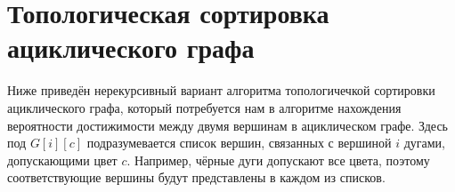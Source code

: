 \section*{Топологическая сортировка ациклического графа}
\par Ниже приведён нерекурсивный вариант алгоритма топологичечкой сортировки ациклического графа, который потребуется нам в алгоритме нахождения вероятности достижимости между двумя вершинам в ациклическом графе. Здесь под $G[i][c]$ подразумевается список вершин, связанных с вершиной $i$ дугами, допускающими цвет $c$. Например, чёрные дуги допускают все цвета, поэтому соответствующие вершины будут представлены в каждом из списков.

